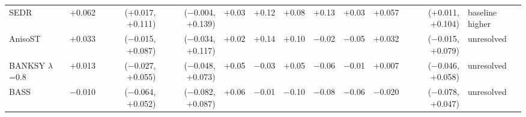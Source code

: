 \begin{tabular}{lrrrrrrrrrrl}
SEDR & +0.062 & (+0.017, +0.111) & ($-$0.004, +0.139) & +0.03 & +0.12 & +0.08 & +0.13 & +0.03 & +0.057 & (+0.011, +0.104) & baseline higher \\
AnisoST & +0.033 & ($-$0.015, +0.087) & ($-$0.034, +0.117) & +0.02 & +0.14 & +0.10 & $-$0.02 & $-$0.05 & +0.032 & ($-$0.015, +0.079) & unresolved \\
BANKSY $\lambda$=0.8 & +0.013 & ($-$0.027, +0.055) & ($-$0.048, +0.073) & +0.05 & $-$0.03 & +0.05 & $-$0.06 & $-$0.01 & +0.007 & ($-$0.046, +0.058) & unresolved \\
BASS & $-$0.010 & ($-$0.064, +0.052) & ($-$0.082, +0.087) & +0.06 & $-$0.01 & $-$0.10 & $-$0.08 & $-$0.06 & $-$0.020 & ($-$0.078, +0.047) & unresolved \\
\bottomrule
\end{tabular}
